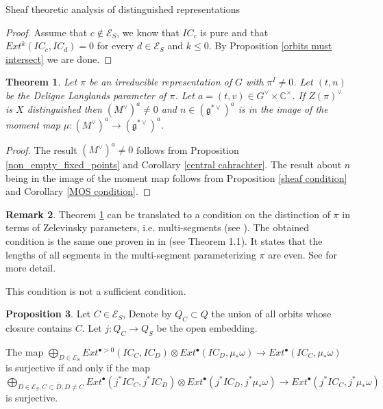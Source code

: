 \documentclass[12pt]{article}
\newcommand{\C}{\mathbb{C}}
\newcommand{\<}{\langle}
\renewcommand{\>}{\rangle}
\theoremstyle{plain}
\newtheorem{theorem}{Theorem}[section]
\theoremstyle{definition}
\newtheorem{prop}[theorem]{Proposition}
\newtheorem{Remark}[theorem]{Remark}
\begin{document}
\begin{section}{Sheaf theoretic analysis of distinguished representations}
\begin{proof}
    Assume that $c\notin\mathcal{E}_S$, we know that $IC_c$ is pure and that $Ext^k(IC_c,IC_d)=0$ for every $d\in \mathcal{E}_S$ and $k\leq 0$. By Proposition \ref{orbits must intersect} we are done.
\end{proof}

\begin{theorem}\label{rep conjecture is true}
     Let $\pi$ be an irreducible representation of $G$ with $\pi^I\neq 0$. Let $(t,n)$ be the Deligne Langlands parameter of $\pi$. Let $a=(t,v)\in G^\vee\times\C^\times$. If $Z(\pi)^\vee$ is $X$ distinguished then $(M^\vee)^a\neq 0$ and $n\in (\mathfrak{g}^{*\vee})^a$ is in the image of the moment map $\mu:(M^\vee)^a\rightarrow (\mathfrak{g}^{*\vee})^a$. 
\end{theorem}

\begin{proof}
    The result $(M^\vee)^a\neq 0$ follows from Proposition \ref{non_empty_fixed_points} and Corollary \ref{central cahrachter}. The result about $n$ being in the image of the moment map follows from Proposition \ref{sheaf condition} and Corollary \ref{MOS condition}.
\end{proof}

\begin{Remark}
     Theorem \ref{rep conjecture is true} can be translated to a condition on the distinction of $\pi$ in terms of Zelevinsky parameters, i.e. multi-segments (see \cite{Zelevinsky1980}). The obtained condition is the same one proven in in \cite{MitraOffenSayag2017} (see Theorem 1.1). It states that the lengths of all segments in the multi-segment parameterizing $\pi$ are even. See \cite{MitraOffenSayag2017} for more detail. 

    This condition is not a sufficient condition.
\end{Remark}

\begin{prop}
    Let $C\in \mathcal{E}_S$, Denote by $Q_C\subset Q$ the union of all orbits whose closure contains $C$. Let $j:Q_C\rightarrow Q_S$ be the open embedding.
    
    The map $\bigoplus_{D\in\mathcal{E}_S}Ext^{\bullet>0}(IC_C,IC_D)\otimes Ext^\bullet(IC_D,\mu_*\omega)\rightarrow Ext^\bullet(IC_C,\mu_*\omega)$ is surjective if and only if the map $\bigoplus_{D\in\mathcal{E}_S,C\subset \overline{D},D\neq C}Ext^{\bullet}(j^*IC_C,j^*IC_D)\otimes Ext^\bullet(j^*IC_D,j^*\mu_*\omega)\rightarrow Ext^\bullet(j^*IC_C,j^*\mu_*\omega)$ is surjective. 
\end{prop}


\end{section}
\end{document}
